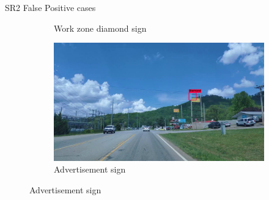 \documentclass{beamer}
\begin{document}
\begin{frame}{SR2 False Positive cases}
\begin{figure}
\begin{center}
\begin{subfigure}[t]{.49\linewidth}
          \caption{Work zone diamond sign}
          \label{fig:workzoneFP}
        \end{subfigure}
        \begin{subfigure}[t]{.49\linewidth}
          \centering
          \includegraphics[width=0.99\linewidth]{figures/examples/sr2/FP/FP_17.png}
          \caption{Advertisement sign}
          \label{fig:advertisementFP}
        \end{subfigure}
        \label{fig:FPcases}
      \end{center}
    \end{figure}
\end{frame}{}
\end{document}
